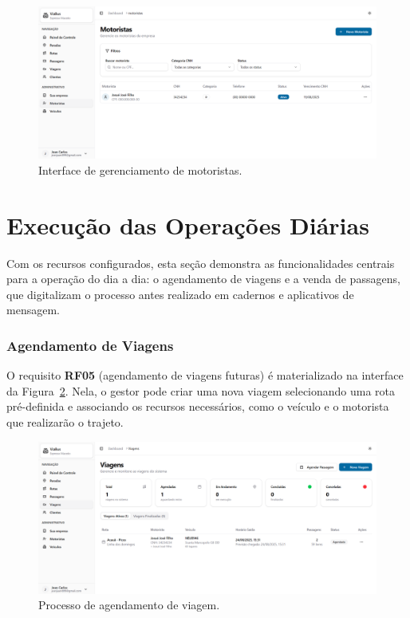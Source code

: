 \begin{figure}[H]
 \centering
 \includegraphics[width=1\textwidth]{imagens/motoristas.png}
 \caption{Interface de gerenciamento de motoristas.}
 \label{fig:motoristas}
\end{figure}

\section{Execução das Operações Diárias}

Com os recursos configurados, esta seção demonstra as funcionalidades centrais para a operação do dia a dia: o agendamento de viagens e a venda de passagens, que digitalizam o processo antes realizado em cadernos e aplicativos de mensagem.

\subsubsection{Agendamento de Viagens}
O requisito \textbf{RF05} (agendamento de viagens futuras) é materializado na interface da Figura~\ref{fig:agendamento-viagem}. Nela, o gestor pode criar uma nova viagem selecionando uma rota pré-definida e associando os recursos necessários, como o veículo e o motorista que realizarão o trajeto.

\begin{figure}[H]
 \centering
 \includegraphics[width=1\textwidth]{imagens/agendamento-viagem.png}
 \caption{Processo de agendamento de viagem.}
 \label{fig:agendamento-viagem}
\end{figure}

